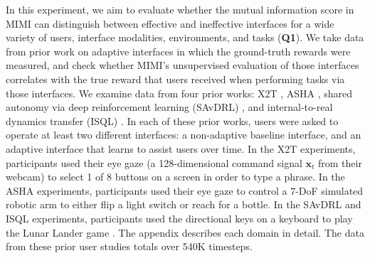 \documentclass{article}
\newcommand{\bx}{\mathbf{x}}
\begin{document}
In this experiment, we aim to evaluate whether the mutual information score in MIMI can distinguish between effective and ineffective interfaces for a wide variety of users, interface modalities, environments, and tasks (\textbf{Q1}).
We take data from prior work on adaptive interfaces in which the ground-truth rewards were measured, and check whether MIMI's unsupervised evaluation of those interfaces correlates with the true reward that users received when performing tasks via those interfaces.
We examine data from four prior works: X2T \cite{x2t2021}, ASHA \cite{asha2022}, shared autonomy via deep reinforcement learning (SAvDRL) \cite{Reddy/etal/18a}, and internal-to-real dynamics transfer (ISQL) \cite{Reddy/etal/18b}.
In each of these prior works, users were asked to operate at least two different interfaces: a non-adaptive baseline interface, and an adaptive interface that learns to assist users over time.
In the X2T experiments, participants used their eye gaze (a 128-dimensional command signal $\bx_t$ from their webcam) to select 1 of 8 buttons on a screen in order to type a phrase.
In the ASHA experiments, participants used their eye gaze to control a 7-DoF simulated robotic arm to either flip a light switch or reach for a bottle.
In the SAvDRL and ISQL experiments, participants used the directional keys on a keyboard to play the Lunar Lander game \cite{brockman2016openai}.
The appendix describes each domain in detail.
The data from these prior user studies totals over 540K timesteps.
\end{document}
